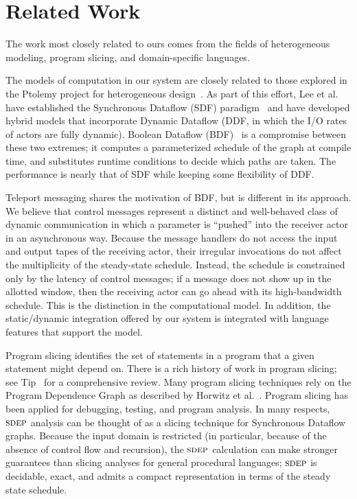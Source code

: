 \section{Related Work}
\label{sec:related-work}

The work most closely related to ours comes from the fields of
heterogeneous modeling, program slicing, and domain-specific
languages.

The models of computation in our system are closely related to those
explored in the Ptolemy project for heterogeneous
design~\cite{ptolemy03overview}.  As part of this effort, Lee et
al. have established the Synchronous Dataflow (SDF)
paradigm~\cite{LM87-i} and have developed hybrid models that
incorporate Dynamic Dataflow (DDF, in which the I/O rates of actors
are fully dynamic).  Boolean Dataflow (BDF)~\cite{ha97profile} is a
compromise between these two extremes; it computes a parameterized
schedule of the graph at compile time, and substitutes runtime
conditions to decide which paths are taken.  The performance is nearly
that of SDF while keeping some flexibility of DDF.  

Teleport messaging shares the motivation of BDF, but is different in
its approach.  We believe that control messages represent a distinct
and well-behaved class of dynamic communication in which a parameter
is ``pushed'' into the receiver actor in an asynchronous way.  Because
the message handlers do not access the input and output tapes of the
receiving actor, their irregular invocations do not affect the
multiplicity of the steady-state schedule.  Instead, the schedule is
constrained only by the latency of control messages; if a message does
not show up in the allotted window, then the receiving actor can go
ahead with its high-bandwidth schedule.  This is the distinction in
the computational model.  In addition, the static/dynamic integration
offered by our system is integrated with language features that
support the model.

Program slicing identifies the set of statements in a program that a
given statement might depend on.  There is a rich history of work in
program slicing; see Tip~\cite{tip95slice} for a comprehensive review.
Many program slicing techniques rely on the Program Dependence Graph
as described by Horwitz et al.~\cite{hrb88pdg}.  Program slicing has
been applied for debugging, testing, and program analysis.  In many
respects, $\textsc{sdep}$ analysis can be thought of as a slicing technique
for Synchronous Dataflow graphs.  Because the input domain is
restricted (in particular, because of the absence of control flow and
recursion), the $\textsc{sdep}$ calculation can make stronger guarantees than
slicing analyses for general procedural languages; $\textsc{sdep}$ is
decidable, exact, and admits a compact representation in terms of the
steady state schedule.

